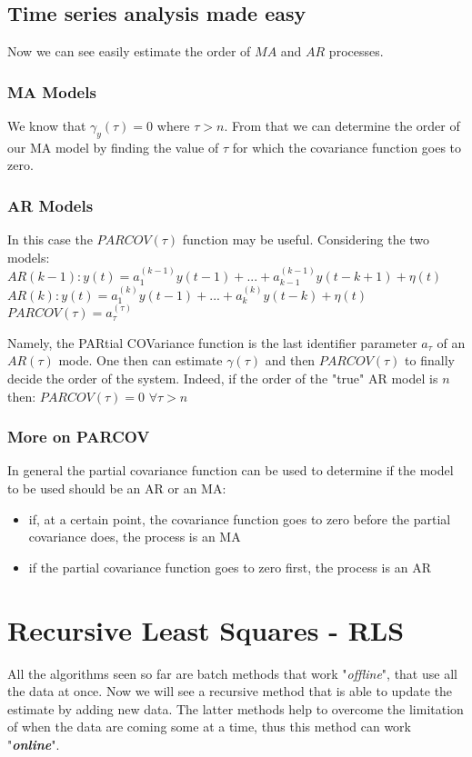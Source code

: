 \documentclass[10pt,a4paper]{article}
\begin{document}
\subsection{Time series analysis made easy}
Now we can see easily estimate the order of $MA$ and $AR$ processes.
\subsubsection{MA Models}
We know that $\gamma_y(\tau)=0$ where $\tau > n$. From that we can determine the order of our MA model by finding the value of $\tau$ for which the covariance function goes to zero.
\subsubsection{AR Models} 
In this case the $PARCOV(\tau)$ function may be useful. Considering the two models:
\center 
	$AR(k-1):y(t)=a_1^{(k-1)}y(t-1)+...+a_{k-1}^{(k-1)}y(t-k+1) + \eta(t)$ \\
	$AR(k):y(t)=a_1^{(k)}y(t-1)+...+a_{k}^{(k)}y(t-k) + \eta(t)$ \\
	$PARCOV(\tau)=a_\tau^{(\tau)}$ \\
	\raggedright \vspace{0.5em}
	Namely, the PARtial COVariance function is the last identifier parameter $a_\tau$ of an $AR(\tau)$ mode. One then can estimate $\gamma(\tau)$ and then $PARCOV(\tau)$ to finally decide the order of the system. Indeed, if the order of the "true" AR model is $n$ then:
	\center $PARCOV(\tau)=0$ $\forall \tau > n$
	\\ \raggedright
\subsubsection{More on PARCOV}
In general the partial covariance function can be used to determine if the model to be used should be an AR or an MA:
\begin{itemize}
	\item if, at a certain point, the covariance function goes to zero before the partial covariance does, the process is an MA
	\item if the partial covariance function goes to zero first, the process is an AR
\end{itemize}
\section{Recursive Least Squares - RLS}
All the algorithms seen so far are batch methods that work "\textit{offline}", that use all the data at once. Now we will see a recursive method that is able to update the estimate by adding new data. The latter methods help to overcome the limitation of when the data are coming some at a time, thus this method can work "\textbf{\textit{online}}".
\end{document}
